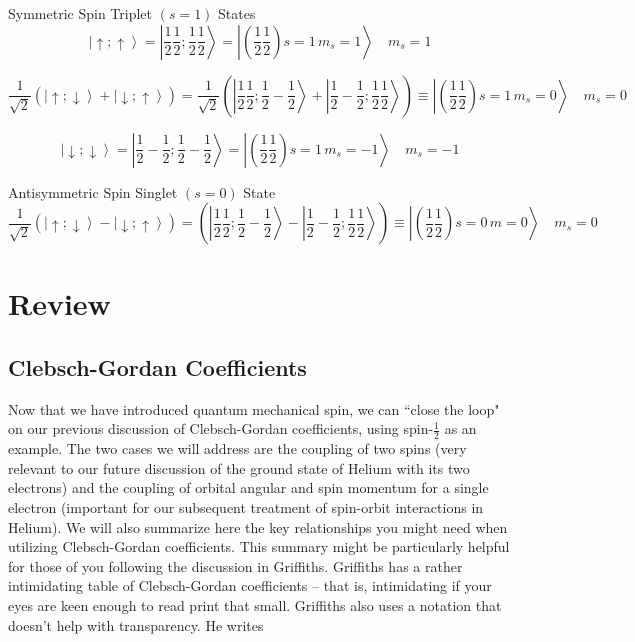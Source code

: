 \begin{subbox}{Symmetric Spin Triplet $(s = 1)$ States}
  \[
\left|\uparrow; \uparrow\right\rangle = \left| \frac{1}{2} \frac{1}{2}; \frac{1}{2} \frac{1}{2} \right\rangle = \left| \left( \frac{1}{2} \frac{1}{2} \right) s = 1 \, m_s = 1 \right\rangle \quad m_s = 1
\]

\[
\frac{1}{\sqrt{2}} \left( \left| \uparrow; \downarrow \right\rangle + \left| \downarrow; \uparrow \right\rangle \right) = \frac{1}{\sqrt{2}} \left( \left| \frac{1}{2} \frac{1}{2}; \frac{1}{2} - \frac{1}{2} \right\rangle + \left| \frac{1}{2} - \frac{1}{2}; \frac{1}{2} \frac{1}{2} \right\rangle \right) \equiv \left| \left( \frac{1}{2} \frac{1}{2} \right) s = 1 \, m_s = 0 \right\rangle \quad m_s = 0
\]

\[
\left| \downarrow; \downarrow \right\rangle = \left| \frac{1}{2} - \frac{1}{2}; \frac{1}{2} - \frac{1}{2} \right\rangle = \left| \left( \frac{1}{2} \frac{1}{2} \right) s = 1 \, m_s = -1 \right\rangle \quad m_s = -1
\]
\end{subbox}

\begin{mainbox}{Antisymmetric Spin Singlet $(s =0)$ State}
  \[
\frac{1}{\sqrt{2}} \left( \left| \uparrow; \downarrow \right\rangle - \left| \downarrow; \uparrow \right\rangle \right) = \left( \left| \frac{1}{2} \frac{1}{2}; \frac{1}{2} - \frac{1}{2} \right\rangle - \left| \frac{1}{2} - \frac{1}{2}; \frac{1}{2} \frac{1}{2} \right\rangle \right) \equiv \left| \left( \frac{1}{2} \frac{1}{2} \right) s = 0 \, m = 0 \right\rangle \quad m_s = 0
\]
\end{mainbox}


\section{Review}

\subsection{Clebsch-Gordan Coefficients}

Now that we have introduced quantum mechanical spin, we can ``close the loop"
on our previous discussion of Clebsch-Gordan coefficients, using
spin-$\frac{1}{2}$ as an example. The two cases we will address are the
coupling of two spins (very relevant to our future discussion of the ground
state of Helium with its two electrons) and the coupling of orbital angular and
spin momentum for a single electron (important for our subsequent treatment of
spin-orbit interactions in Helium). We will also summarize here the key
relationships you might need when utilizing Clebsch-Gordan coefficients. This
summary might be particularly helpful for those of you following the discussion
in Griffiths. Griffiths has a rather intimidating table of Clebsch-Gordan
coefficients -- that is, intimidating if your eyes are keen enough to read
print that small. Griffiths also uses a notation that doesn't help with
transparency. He writes 


